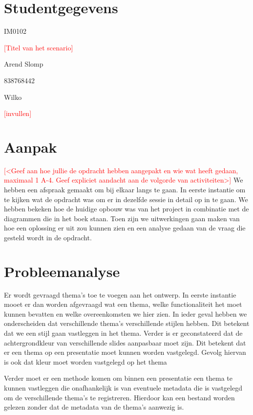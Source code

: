 \documentclass[a4paper]{article}
\newcommand{\todo}[1]{\textcolor{red}{[#1]}}
\begin{document}
\pagestyle{fancy}

\section*{Studentgegevens}
\begin{description}
	\item [Cursuscode] IM0102
	\item \todo{Titel van het scenario}
	\item [Naam] Arend Slomp
	\item [Studentnummer] 838768442
	\item [Naam] Wilko
	\item [Studentnummer] \todo{invullen}
\end{description}

\section*{Aanpak}
\todo{<Geef aan hoe jullie de opdracht hebben aangepakt en wie wat heeft gedaan, maximaal 1 A-4. Geef expliciet aandacht aan de volgorde van activiteiten>}
We hebben een afspraak gemaakt om bij elkaar langs te gaan. In eerste instantie om te kijken wat de opdracht was om er in dezelfde sessie in detail op in te gaan. We hebben bekeken hoe de huidige opbouw was van het project in combinatie met de diagrammen die in het boek staan. Toen zijn we uitwerkingen gaan maken van hoe een oplossing er uit zou kunnen zien en een analyse gedaan van de vraag die gesteld wordt in de opdracht.


\section{Probleemanalyse}
Er wordt gevraagd thema's toe te voegen aan het ontwerp.
In eerste instantie mooet er dan worden afgevraagd wat een thema, welke functionaliteit het moet kunnen bevatten en welke overeenkomsten we hier zien.
In ieder geval hebben we onderscheiden dat verschillende thema's verschillende stijlen hebben. Dit betekent dat we een stijl gaan vastleggen in het thema.
Verder is er geconstateerd dat de achtergrondkleur van verschillende slides aanpasbaar moet zijn.
Dit betekent dat er een thema op een presentatie moet kunnen worden vastgelegd. Gevolg hiervan is ook dat kleur moet worden vastgelegd op het thema

Verder moet er een methode komen om binnen een presentatie een thema te kunnen vastleggen die onafhankelijk is van eventuele metadata die is vastgelegd om de verschillende thema's te registreren. Hierdoor kan een bestand worden gelezen zonder dat de metadata van de thema's aanwezig is.
\end{document}
